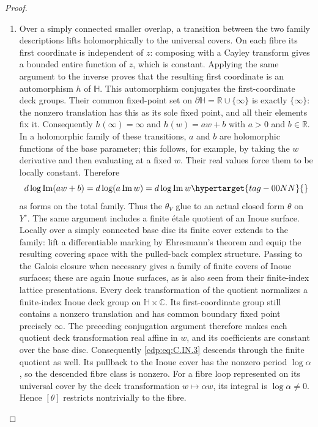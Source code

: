 \begin{proof}
\begin{enumerate}[leftmargin=*]
\item Over a simply connected smaller overlap, a transition
between the two family descriptions lifts holomorphically to the
universal covers. On each fibre its first coordinate is independent
of $z$: composing with a Cayley transform gives a bounded entire
function of $z$, which is constant. Applying the same argument to
the inverse proves that the resulting first coordinate is an
automorphism $h$ of $\mathbb H$. This automorphism conjugates the
first-coordinate deck groups. Their common fixed-point set on
$\partial\mathbb H=\mathbb R\cup\{\infty\}$ is exactly
$\{\infty\}$: the nonzero translation has this as its sole fixed
point, and all their elements fix it. Consequently $h(\infty)=
\infty$ and $h(w)=a w+b$ with $a>0$ and $b\in\mathbb R$.
In a holomorphic family of these transitions, $a$ and $b$ are
holomorphic functions of the base parameter; this follows, for
example, by taking the $w$ derivative and then evaluating at a
fixed $w$. Their real values force them to be locally constant.
Therefore
\begin{equation}
 d\log\operatorname{Im}(a w+b)
 =d\log(a\operatorname{Im}w)
 =d\log\operatorname{Im}w
\hypertarget{tag-00NN}{}\label{cdp:eq:C.IN.4}
\end{equation}
as forms on the total family. Thus the $\theta_V$ glue to an
actual closed form $\theta$ on $Y^\circ$.
The same argument includes a finite \'etale quotient of an Inoue
surface. Locally over a simply connected base disc its finite
cover extends to the family: lift a differentiable marking by
Ehresmann's theorem and equip the resulting covering space with
the pulled-back complex structure. Passing to the Galois closure
when necessary gives a family of finite covers of Inoue surfaces;
these are again Inoue surfaces, as is also seen from their
finite-index lattice presentations. Every deck transformation of
the quotient normalizes a finite-index Inoue deck group on
$\mathbb H\times\mathbb C$. Its first-coordinate group still
contains a nonzero translation and has common boundary fixed
point precisely $\infty$. The preceding conjugation argument
therefore makes each quotient deck transformation real affine in
$w$, and its coefficients are constant over the base disc.
Consequently \eqref{cdp:eq:C.IN.3} descends through the finite quotient as
well. Its pullback to the Inoue cover has the nonzero period
$\log\alpha$, so the descended fibre class is nonzero.
For a fibre loop represented on its universal cover by the deck
transformation $w\mapsto\alpha w$, its integral is
$\log\alpha\ne0$. Hence $[\theta]$ restricts nontrivially to
the fibre.


\end{enumerate}
\end{proof}

